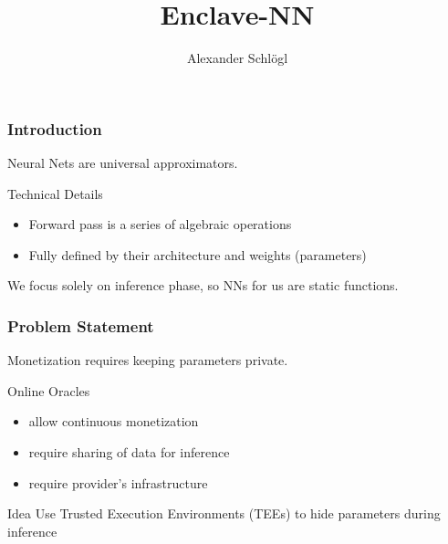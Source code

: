 \documentclass[aspectratio=169,nototalframenumber]{beamer}
\title{Enclave-NN}
\author{Alexander Schl\"ogl}
\begin{document}
\uibktitlepage{}

\begin{frame}[label=basics]
    \frametitle{Introduction}

    Neural Nets are universal approximators\cite{hornik1991approximation}.

	\vspace{4ex}

	\begin{block}{Technical Details}
    	\begin{itemize}
        	\item Forward pass is a series of algebraic operations
        	\item Fully defined by their architecture and weights (parameters)
    	\end{itemize}
	\end{block}

	We focus solely on inference phase, so NNs for us are static functions.
\end{frame}

\begin{frame}
    \frametitle{Problem Statement}

	Monetization requires keeping parameters private.
	\vspace{3ex}
	\pause

	\begin{block}{Online Oracles}
    	\begin{itemize}
        	\item allow continuous monetization
        	\item require sharing of data for inference
        	\item require provider's infrastructure
    	\end{itemize}
	\end{block}

	\pause

	\begin{alertblock}{Idea}
    	Use Trusted Execution Environments (TEEs) to hide parameters during inference
	\end{alertblock}
\end{frame}
\end{document}
